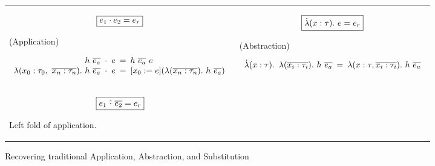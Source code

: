 \documentclass[a4paper]{jfp}
\begin{document}
\begin{figure}[H]
   \caption{Recovering traditional Application, Abstraction, and Substitution}
   \begin{tabular}{p{}p{}}
   	\begin{displaymath}
              \text{\framebox{$ e_1 \cdot e_2 = e_r $}}
	\end{displaymath}
   \begin{center}
           (Application)
   \end{center}
     \begin{displaymath}
     \begin{array}{r@{\hspace{0.5em}}c@{\hspace{0.5em}}l@{\hspace{0.5em}}c@{\hspace{0.5em}}l@{\hspace{1pt}}r}
     h\ \overline{e_a} & \cdot & e & = & h\ \overline{e_a}\ e &\\
     \lambda(x_0 : \tau_0,\ \overline {x_n : \tau_n}).\ h\ \overline{e_a} & \cdot & e & = & [x_0 := e ](\lambda(\overline{x_n : \tau_n}).\ h\ \overline{e_a}) & \\
     \end{array}
     \end{displaymath} &
   	\begin{displaymath}
              \text{\framebox{$ \dot{\lambda}(x : \tau).\ e = e_r $}}
	\end{displaymath}
   \begin{center}
           (Abstraction)
   \end{center}
   \begin{displaymath}
           \begin{array}{r@{\hspace{0.5em}}r@{\hspace{0.5em}}c@{\hspace{0.5em}}l}
                   \dot{\lambda}(x : \tau). & \lambda(\overline{x_i : \tau_i}).\ h\ \overline{e_a} & = & \lambda(x : \tau, \overline{x_i : \tau_i}).\ h\ \overline{e_a}
           \end{array}
   \end{displaymath}   \\
   	\begin{displaymath}
              \text{\framebox{$ e_1\ \hat{\cdot}\ \overline{e_2} = e_r $}}
	\end{displaymath}
   \begin{center}
           Left fold of application.
   \end{center}         &


\end{tabular}
\end{figure}
\end{document}

